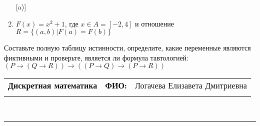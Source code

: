 \documentclass[10pt]{exam}
\newcommand{\class}{Дискретная математика}
\newcommand{\examdate}{}
\begin{document}
\begin{questions}
\begin{enumerate} [a)]
\item $F(x)=x^{2}+1$, где $x \in A = [-2, 4]$ и отношение $R = \{(a,b)|F(a) = F(b)\}$
\end{enumerate}\question Составьте полную таблицу истинности, определите, какие переменные являются фиктивными и проверьте, является ли формула тавтологией:
$(P \rightarrow (Q \rightarrow R)) \rightarrow ((P \rightarrow Q) \rightarrow (P \rightarrow R))$

\end{questions}
\newpage
\begin{flushright}
\begin{tabular}{p{2.8in} r l}
\textbf{\class} & \textbf{ФИО:} &Логачева Елизавета Дмитриевна
\\

\textbf{\examdate} &&\\
\end{tabular}\\
\end{flushright}
\rule[1ex]{\textwidth}{.1pt}
\end{document}
